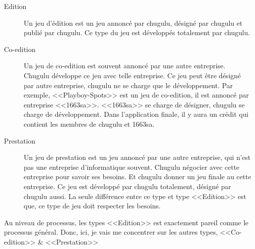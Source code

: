 \begin{description}
	\item[Edition] Un jeu d'édition est un jeu annoncé par chugulu, désigné par chugulu et publié par chugulu. Ce type du jeu est développés totalement par chugulu.
	\item[Co-edition] Un jeu de co-edition est souvent annoncé par une autre entreprise. Chugulu développe ce jeu avec telle entreprise. Ce jeu peut être désigné par autre entreprise, chugulu ne se charge que le développement. Par exemple, <<Playboy-Spots>> est un jeu de co-edition, il est annoncé par entreprise <<1663sa>>. <<1663sa>> se charge de désigner, chugulu se charge de développement. Dans l'application finale, il y aura un crédit qui contient les membres de chugulu et 1663sa.
	\item[Prestation] Un jeu de prestation est un jeu annoncé par une autre entreprise, qui n'est pas une entreprise d'informatique souvent. Chugulu négocier avec cette entreprise pour savoir ses besoins. Et chugulu donner un jeu finale au cette entreprise. Ce jeu est développé par chugulu totalement, désigné par chugulu aussi. La seule différence entre ce type et type <<Edition>> est que, ce type de jeu doit respecter les besoins.
\end{description}

Au niveau de processus, les types <<Edition>> est exactement pareil comme le processus général. Donc, ici, je vais me concentrer sur les autres types, <<Co-edition>> \& <<Prestation>>


